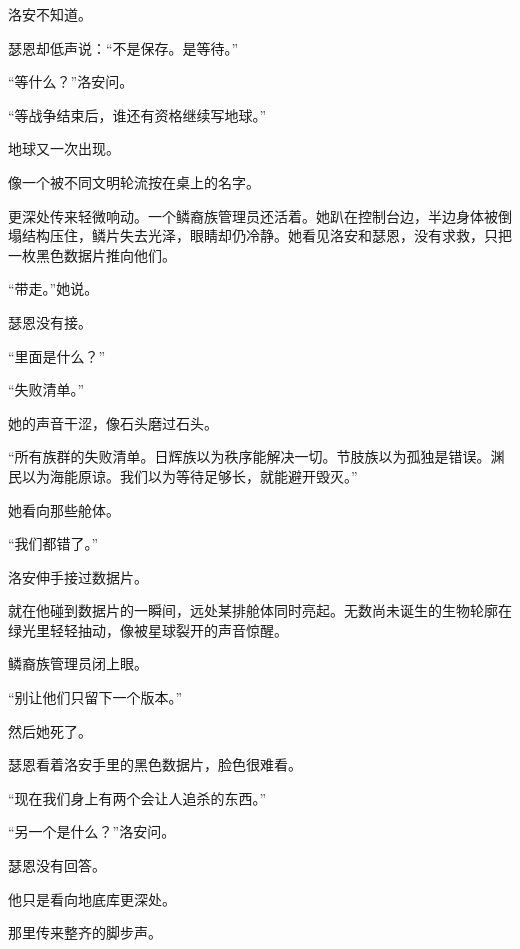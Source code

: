 洛安不知道。

瑟恩却低声说：“不是保存。是等待。”

“等什么？”洛安问。

“等战争结束后，谁还有资格继续写地球。”

地球又一次出现。

像一个被不同文明轮流按在桌上的名字。

更深处传来轻微响动。一个鳞裔族管理员还活着。她趴在控制台边，半边身体被倒塌结构压住，鳞片失去光泽，眼睛却仍冷静。她看见洛安和瑟恩，没有求救，只把一枚黑色数据片推向他们。

“带走。”她说。

瑟恩没有接。

“里面是什么？”

“失败清单。”

她的声音干涩，像石头磨过石头。

“所有族群的失败清单。日辉族以为秩序能解决一切。节肢族以为孤独是错误。渊民以为海能原谅。我们以为等待足够长，就能避开毁灭。”

她看向那些舱体。

“我们都错了。”

洛安伸手接过数据片。

就在他碰到数据片的一瞬间，远处某排舱体同时亮起。无数尚未诞生的生物轮廓在绿光里轻轻抽动，像被星球裂开的声音惊醒。

鳞裔族管理员闭上眼。

“别让他们只留下一个版本。”

然后她死了。

瑟恩看着洛安手里的黑色数据片，脸色很难看。

“现在我们身上有两个会让人追杀的东西。”

“另一个是什么？”洛安问。

瑟恩没有回答。

他只是看向地底库更深处。

那里传来整齐的脚步声。
